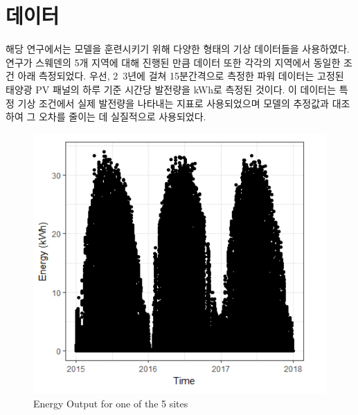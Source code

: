 \documentclass{article}
\begin{document}
\section{데이터}
해당 연구에서는 모델을 훈련시키기 위해 다양한 형태의 기상 데이터들을 사용하였다. 연구가 스웨덴의 5개 지역에 대해 진행된 만큼 데이터 또한 각각의 지역에서 동일한 조건 아래 측정되었다. 우선, 2~3년에 걸쳐 15분간격으로 측정한 파워 데이터는 고정된 태양광 PV 패널의 하루 기준 시간당 발전량을 kWh로 측정된 것이다. 이 데이터는 특정 기상 조건에서 실제 발전량을 나타내는 지표로 사용되었으며 모델의 추정값과 대조하여 그 오차를 줄이는 데 실질적으로 사용되었다.

\begin{figure}[h]
\centering
\includegraphics[scale=0.20]{./fig/Figure_4.png}
\caption{Energy Output for one of the 5 sites}
\label{fig_2}
\end{figure}
\end{document}
